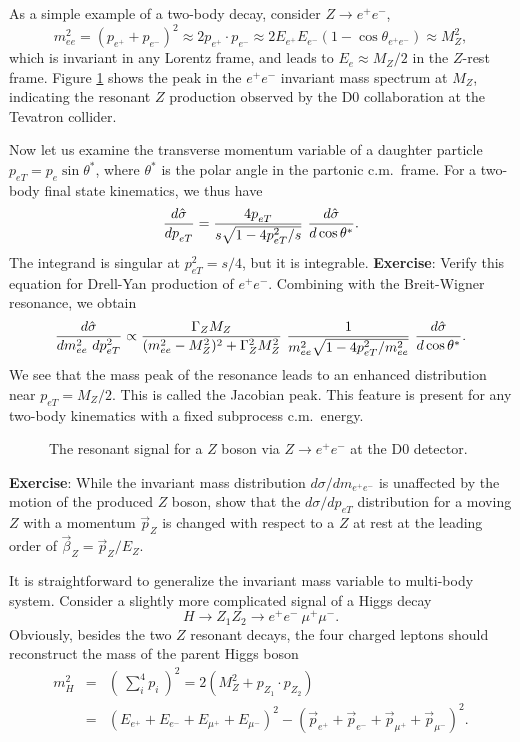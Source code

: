 \documentclass[12pt,prd,aps,floats,preprintnumbers,preprint,superscriptaddress,floatfix,nofootinbib]{revtex4}
\def\epem{e^+e^-}
\def\be{\begin{equation}}
\def\ee{\end{equation}}
\def\bea{\begin{eqnarray}}
\def\eea{\end{eqnarray}}
\begin{document}
As a simple example of a two-body decay, consider  $Z\to \epem$,
\be 
m_{ee}^2  = (p_{e^+} + p_{e^-})^2
\approx 2 p_{e^+} \cdot p_{e^-} \approx  2E_{e^+} E_{e^-} (1-\cos\theta_{\epem})
\approx M_Z^2,
\ee
which is invariant in any Lorentz frame, and leads to $E_e \approx M_Z/2$
in the $Z$-rest frame. Figure \ref{Zee} shows the peak 
in the $\epem$ invariant mass spectrum at $M_Z$, indicating the
resonant $Z$ production observed by the D0 collaboration \cite{d0} 
at the Tevatron collider.

Now let us examine the transverse momentum variable of a daughter
particle $p_{eT}^{}=p_e \sin\theta^*$, where $\theta^*$ is the polar angle
in the partonic c.m.~frame.  For a two-body final state kinematics, 
we thus have
\be
{d\hat\sigma\over dp_{eT}^{} } = {4p^{}_{eT} \over s \sqrt{1-4p_{eT}^2/s}}\ 
{d\hat\sigma\over d\cos\theta^* }.
\ee
The integrand is singular at  $p_{eT}^2 = s/4$, but it is integrable.
{
\vskip 0.2cm
\noindent
{\bf Exercise}: Verify this equation for  Drell-Yan production of $\epem$.
\vskip 0.2cm
}
\noindent
Combining with the Breit-Wigner resonance, we obtain
\be
{d\hat\sigma\over dm_{ee}^2\ dp_{eT}^2 } \propto
\frac{\Gamma_ZM_Z}{ (m^2_{ee}-M^2_Z)^2 + \Gamma_Z^2 M_Z^2}\ 
{1 \over m_{ee}^2\sqrt{1-4p_{eT}^2/m_{ee}^2}}\  {d\hat\sigma\over d\cos\theta^* }.
\ee
We see that the mass peak of the resonance leads to an enhanced
distribution near  $p_{eT}^{} = M_Z^{}/2$. This is called the Jacobian peak. 
This feature is present for any two-body kinematics with a fixed subprocess 
c.m.~energy. 

\begin{center}
\begin{figure}[tb]
\caption{The resonant signal for a $Z$ boson via $Z\to \epem$
at the D0 detector.}
\label{Zee}
\end{figure}
\end{center}

{
\vskip 0.2cm
\noindent
{\bf Exercise}: While the invariant mass distribution $d\sigma/dm_{\epem}$ is 
unaffected by the motion of the produced $Z$ boson, show that the 
$d\sigma/ dp_{eT}^{}$ distribution for a moving $Z$ with a momentum $\vec p_Z^{}$ is changed 
 with respect to a $Z$ at rest  at the leading order of $\vec \beta_Z^{} = \vec p_Z^{}/E_Z$.
\vskip 0.2cm
}

It is straightforward to generalize the invariant mass variable to multi-body
system. Consider a slightly more complicated signal of a Higgs decay
\be
H \to Z_1 Z_2 \to \epem\ \mu^+\mu^-.
\ee
Obviously, besides the two $Z$ resonant decays, the four charged
leptons should reconstruct the mass of the parent Higgs boson
\bea
m_H^2 &=& (\ \sum_i^4 p_{i} \ )^2 =  2 (M_Z^2 + p^{}_{Z_1} \cdot p^{}_{Z_2}) \\
 &=& (E_{e^+} + E_{e^-} + E_{\mu^+} + E_{\mu^-})^2
- (\vec p_{e^+} + \vec p_{e^-}  + \vec p_{\mu^+} + \vec p_{\mu^-})^2.
\label{Minv}
\eea
\end{document}
